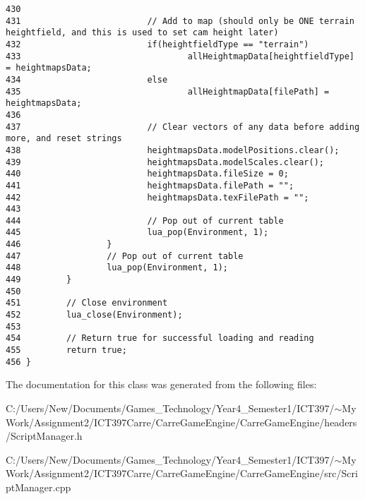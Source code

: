 \begin{Code}
\begin{verbatim}
430 
431                         // Add to map (should only be ONE terrain heightfield, and this is used to set cam height later)
432                         if(heightfieldType == "terrain")
433                                 allHeightmapData[heightfieldType] = heightmapsData;
434                         else
435                                 allHeightmapData[filePath] = heightmapsData;
436 
437                         // Clear vectors of any data before adding more, and reset strings
438                         heightmapsData.modelPositions.clear();
439                         heightmapsData.modelScales.clear();
440                         heightmapsData.fileSize = 0;
441                         heightmapsData.filePath = "";
442                         heightmapsData.texFilePath = "";
443 
444                         // Pop out of current table
445                         lua_pop(Environment, 1);
446                 }
447                 // Pop out of current table
448                 lua_pop(Environment, 1);
449         }
450 
451         // Close environment
452         lua_close(Environment);
453 
454         // Return true for successful loading and reading
455         return true;
456 }\end{verbatim}
\end{Code}




The documentation for this class was generated from the following files:\begin{CompactItemize}
\item 
C:/Users/New/Documents/Games\_\-Technology/Year4\_\-Semester1/ICT397/$\sim$My Work/Assignment2/ICT397Carre/CarreGameEngine/CarreGameEngine/headers/ScriptManager.h\item 
C:/Users/New/Documents/Games\_\-Technology/Year4\_\-Semester1/ICT397/$\sim$My Work/Assignment2/ICT397Carre/CarreGameEngine/CarreGameEngine/src/ScriptManager.cpp\end{CompactItemize}
